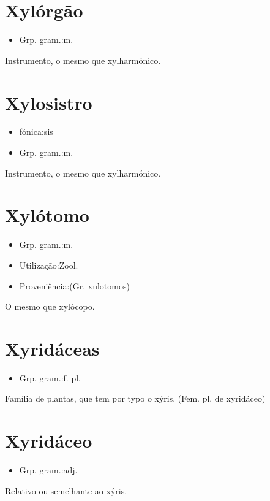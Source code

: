\section{Xylórgão}
\begin{itemize}
\item {Grp. gram.:m.}
\end{itemize}
Instrumento, o mesmo que \textunderscore xylharmónico\textunderscore .
\section{Xylosistro}
\begin{itemize}
\item {fónica:sis}
\end{itemize}
\begin{itemize}
\item {Grp. gram.:m.}
\end{itemize}
Instrumento, o mesmo que \textunderscore xylharmónico\textunderscore .
\section{Xylótomo}
\begin{itemize}
\item {Grp. gram.:m.}
\end{itemize}
\begin{itemize}
\item {Utilização:Zool.}
\end{itemize}
\begin{itemize}
\item {Proveniência:(Gr. \textunderscore xulotomos\textunderscore )}
\end{itemize}
O mesmo que \textunderscore xylócopo\textunderscore .
\section{Xyridáceas}
\begin{itemize}
\item {Grp. gram.:f. pl.}
\end{itemize}
Família de plantas, que tem por typo o xýris.
(Fem. pl. de \textunderscore xyridáceo\textunderscore )
\section{Xyridáceo}
\begin{itemize}
\item {Grp. gram.:adj.}
\end{itemize}
Relativo ou semelhante ao xýris.
